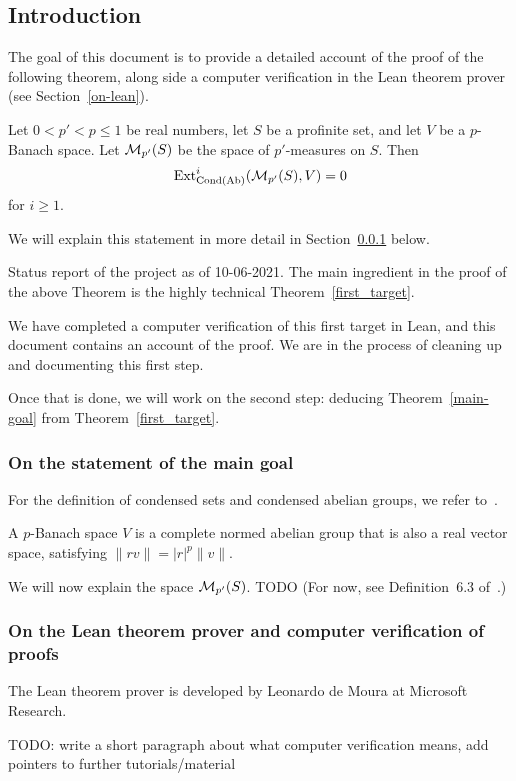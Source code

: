 \subsection*{Introduction}
\label{intro}

The goal of this document is to provide a detailed account
of the proof of the following theorem,
along side a computer verification in the Lean theorem prover
(see Section~\ref{on-lean}).

\begin{theoremx}
  \label{main-goal}
  Let $0 < p' < p \le 1$ be real numbers,
  let $S$ be a profinite set,
  and let $V$ be a $p$-Banach space.
  Let $\mathcal M_{p'}(S)$ be the space of $p'$-measures on $S$.
  Then
  \[
    \operatorname{Ext}^i_{\operatorname{Cond}(\operatorname{Ab})}(\mathcal M_{p'}(S), V)=0
  \]
  for $i \ge 1$.
\end{theoremx}

We will explain this statement in more detail in Section~\ref{on-the-statement} below.

\begin{remarkx}
  Status report of the project as of 10-06-2021.
  The main ingredient in the proof of the above Theorem
  is the highly technical Theorem~\ref{first_target}.

  We have completed a computer verification of this first target in Lean,
  and this document contains an account of the proof.
  We are in the process of cleaning up and documenting this first step.

  Once that is done, we will work on the second step:
  deducing Theorem~\ref{main-goal} from Theorem~\ref{first_target}.
\end{remarkx}

\subsubsection{On the statement of the main goal}
\label{on-the-statement}

For the definition of condensed sets and condensed abelian groups,
we refer to~\cite{Condensed}.

A $p$-Banach space $V$ is a complete normed abelian group
that is also a real vector space,
satisfying $\|rv\| = |r|^p\|v\|$.

We will now explain the space $\mathcal M_{p'}(S)$.
TODO
(For now, see Definition~6.3 of~\cite{Analytic}.)

\subsubsection*{On the Lean theorem prover and computer verification of proofs}
\label{on-lean}

The Lean theorem prover is developed by Leonardo de Moura
at Microsoft Research.

TODO: write a short paragraph about what computer verification means,
add pointers to further tutorials/material

